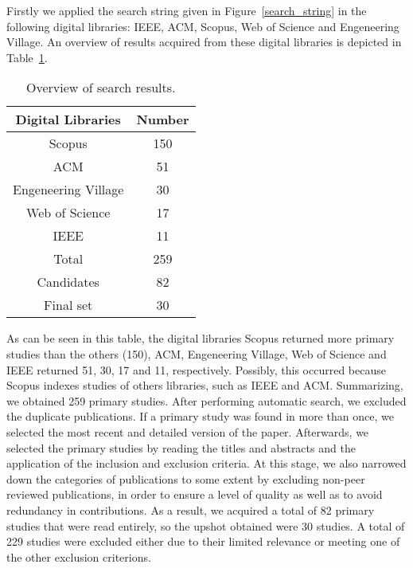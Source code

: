 Firstly we applied the search string given in Figure~\ref{search_string} in the following digital libraries: IEEE, ACM, Scopus, Web of Science and Engeneering Village. An overview of results acquired from these digital libraries is depicted in Table~\ref{result_digital}.
\begin{table}[!h]
\centering
\caption{Overview of search results.}
\begin{tabular}{|c|c|}
\hline 
\cellcolor{gray}Digital Libraries & \cellcolor{gray}Number\tabularnewline
\hline 
\hline 
Scopus & 150\tabularnewline
\hline 
ACM & 51\tabularnewline
\hline 
Engeneering Village & 30\tabularnewline
\hline 
Web of Science & 17\tabularnewline
\hline 
IEEE & 11\tabularnewline
\hline 
\cellcolor{gray!25}Total & \cellcolor{gray!25}259\tabularnewline
\hline 
\cellcolor{gray!25}Candidates & \cellcolor{gray!25}82\tabularnewline
\hline 
\cellcolor{gray!25}Final set & \cellcolor{gray!25}30\tabularnewline
\hline 
\end{tabular}
\label{result_digital}
\end{table} 
As can be seen in this table, the digital libraries Scopus returned more primary studies than the others (150), ACM, Engeneering Village, Web of Science and IEEE returned 51, 30, 17 and 11, respectively. Possibly, this occurred because Scopus indexes studies of others libraries, such as IEEE and ACM. Summarizing, we obtained 259 primary studies. After performing automatic search, we excluded the duplicate publications. If a primary study was found in more than once, we selected the most recent and detailed version of the paper. Afterwards, we selected the primary studies by reading the titles and abstracts and the application of the inclusion and exclusion criteria. At this stage, we also narrowed down the categories of publications to some extent by excluding non-peer reviewed publications, in order to ensure a level of quality as well as to avoid redundancy in contributions. As a result, we acquired a total of 82 primary studies that were read entirely, so the upshot obtained were 30 studies. A total of 229 studies were excluded either due to their limited relevance or meeting one of the other exclusion criterions.

